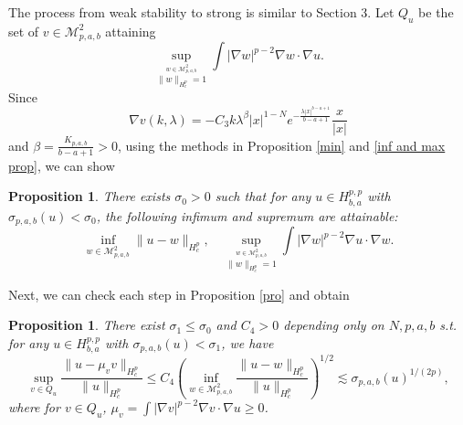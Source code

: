 \documentclass[11pt]{article}
\newtheorem{proposition}[theorem]{Proposition}
\numberwithin{equation}{section}
\begin{document}
The process from weak stability to strong is similar to Section 3. Let $Q_u$ be the set of $v\in\mathcal{M}_{p,a,b}^2$ attaining
\[ \sup_{\stackrel{w\in \mathcal{M}^2_{p,a,b}}{\|w\|_{H_c^p}=1}} \int |\nabla w|^{p-2}\nabla w\cdot \nabla u. \]
Since
\[ \nabla v(k,\lambda) = -C_3k\lambda^\beta |x|^{1-N}e^{-\frac{\lambda|x|^{b-a+1}}{b-a+1}}\frac{x}{|x|}\]
and $\beta=\frac{K_{p,a,b}}{b-a+1}>0$, using the methods in Proposition \ref{min} and \ref{inf and max prop}, we can show
\begin{proposition}
    There exists $\sigma_0>0$ such that for any $u\in H_{b,a}^{p,p}$ with $\sigma_{p,a,b}(u)<\sigma_0$, the following  infimum and supremum are attainable:
    \begin{equation}
        \inf_{w\in \mathcal{M}_{p,a,b}^2} \|u-w\|_{H^p_c}, \quad \sup_{ \stackrel{w\in \mathcal{M}_{p,a,b}^2}{\|w\|_{H^p_c}=1} } \int |\nabla w|^{p-2}\nabla u\cdot \nabla w.
    \end{equation}
\end{proposition}

Next, we can check each step in Proposition \ref{pro} and obtain
\begin{proposition}
    There exist $\sigma_1\le \sigma_0$ and $C_4>0$ depending only on $N,p,a,b$ s.t. for any $u\in H^{p,p}_{b,a}$ with $\sigma_{p,a,b}(u) < \sigma_1$, we have
    \begin{equation}
        \sup_{v\in Q_u}\frac{\|u-\mu_v v\|_{H^p_c}}{\|u\|_{H^p_c}}\le C_4 \left(\inf_{w\in\mathcal{M}_{p,a,b}^2}\frac{\|u-w\|_{H^p_c}}{\|u\|_{H^p_c}}\right)^{1/2} \lesssim \sigma_{p,a,b}(u)^{1/(2p)},
    \end{equation}
    where for $v\in Q_u$, $\mu_v = \int |\nabla v|^{p-2}\nabla v\cdot\nabla u \ge 0$.
\end{proposition}
\end{document}

